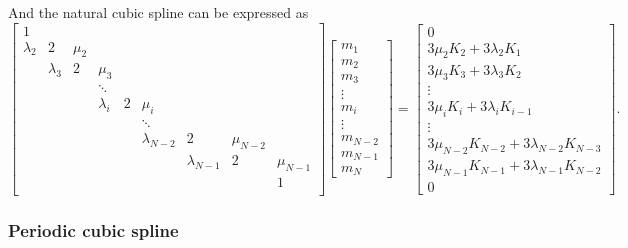 \documentclass[a4paper]{article}
\theoremstyle{definition}
\begin{document}
And the natural cubic spline can be expressed as
\begin{equation}
  \begin{bmatrix}
    1 &  &  &  &  &  &  &  & \\
    \lambda_2 & 2 & \mu_2 &  &  &  &  &  & \\
    & \lambda_3 & 2 & \mu_3 &  &  &  &  & \\
    &   &   & \ddots &  &  &  &  & \\
    &   &   & \lambda_i & 2 & \mu_i &  &  & \\
    &   &   &   &   & \ddots &  &  & \\
    &   &   &   &   & \lambda_{N - 2} & 2 & \mu_{N - 2} & \\
    &   &   &   &   &   & \lambda_{N - 1} & 2 & \mu_{N - 1} \\
    &   &   &   &   &   &   &   & 1 \\
  \end{bmatrix}
  \begin{bmatrix}
    m_1 \\ m_2 \\ m_3 \\ \vdots \\ m_i \\ \vdots \\ m_{N - 2} \\ m_{N - 1} \\ m_N
  \end{bmatrix}
  = \begin{bmatrix}
    0 \\
    3\mu_2 K_2 + 3\lambda_2 K_1 \\
    3\mu_3 K_3 + 3\lambda_3 K_2 \\
    \vdots \\
    3\mu_i K_i + 3\lambda_i K_{i - 1} \\
    \vdots \\
    3\mu_{N - 2} K_{N - 2} + 3\lambda_{N - 2} K_{N - 3} \\
    3\mu_{N - 1} K_{N - 1} + 3\lambda_{N - 1} K_{N - 2} \\
    0
    \end{bmatrix}.
  \label{eq:pp-form-spline-linear-system-natural}
\end{equation}

\subsubsection{Periodic cubic spline}
\end{document}
